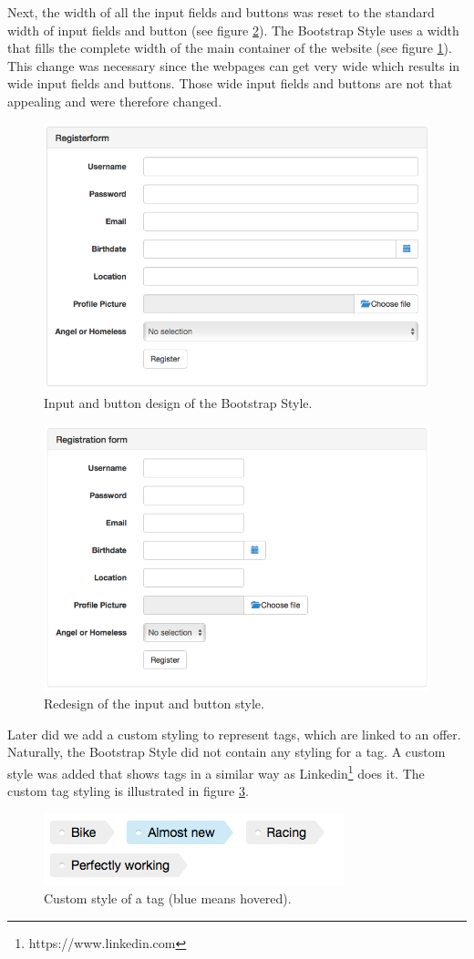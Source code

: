 \documentclass[a4paper]{report}
\begin{document}
{Next, the width of all the input fields and buttons was reset to the standard width of input fields and button (see figure \ref{fig:designInputWidthNew}). The Bootstrap Style uses a width that fills the complete width of the main container of the website (see figure \ref{fig:designInputWidthOld}). This  change was necessary since the webpages can get very wide which results in wide input fields and buttons. Those wide input fields and buttons are not that appealing and were therefore changed.
\begin{figure}[h]
    \centering
    \includegraphics[width=.7\textwidth]{screenshots/designInputWidthOld}
    \caption{Input and button design of the Bootstrap Style.}
    \label{fig:designInputWidthOld}
\end{figure}
\begin{figure}[h]
    \centering
    \includegraphics[width=.7\textwidth]{screenshots/designInputWidthNew}
    \caption{Redesign of the input and button style.}
    \label{fig:designInputWidthNew}
\end{figure}

Later did we add a custom styling to represent tags, which are linked to an offer. Naturally, the Bootstrap Style did not contain any styling for a tag. A custom style was added that shows tags in a similar way as Linkedin\footnote{https://www.linkedin.com} does it. The custom tag styling is illustrated in figure \ref{fig:designTag}.
\begin{figure}[h]
    \centering
    \includegraphics[width=.5\textwidth]{screenshots/designTag}
    \caption{Custom style of a tag (blue means hovered).}
    \label{fig:designTag}
\end{figure}

}
\end{document}
